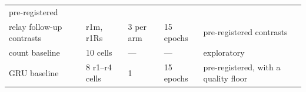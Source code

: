 \documentclass[10pt]{article}
\begin{document}
\begin{longtable}[]{@{}lllll@{}}
\begin{minipage}[t]{0.17\columnwidth}
pre-registered\strut
\end{minipage}\tabularnewline
\begin{minipage}[t]{0.17\columnwidth}\raggedright
relay follow-up contrasts\strut
\end{minipage} & \begin{minipage}[t]{0.17\columnwidth}\raggedright
r1m, r1Rs\strut
\end{minipage} & \begin{minipage}[t]{0.17\columnwidth}\raggedright
3 per arm\strut
\end{minipage} & \begin{minipage}[t]{0.17\columnwidth}\raggedright
15 epochs\strut
\end{minipage} & \begin{minipage}[t]{0.17\columnwidth}\raggedright
pre-registered contrasts\strut
\end{minipage}\tabularnewline
\begin{minipage}[t]{0.17\columnwidth}\raggedright
count baseline\strut
\end{minipage} & \begin{minipage}[t]{0.17\columnwidth}\raggedright
10 cells\strut
\end{minipage} & \begin{minipage}[t]{0.17\columnwidth}\raggedright
---\strut
\end{minipage} & \begin{minipage}[t]{0.17\columnwidth}\raggedright
---\strut
\end{minipage} & \begin{minipage}[t]{0.17\columnwidth}\raggedright
exploratory\strut
\end{minipage}\tabularnewline
\begin{minipage}[t]{0.17\columnwidth}\raggedright
GRU baseline\strut
\end{minipage} & \begin{minipage}[t]{0.17\columnwidth}\raggedright
8 r1--r4 cells\strut
\end{minipage} & \begin{minipage}[t]{0.17\columnwidth}\raggedright
1\strut
\end{minipage} & \begin{minipage}[t]{0.17\columnwidth}\raggedright
15 epochs\strut
\end{minipage} & \begin{minipage}[t]{0.17\columnwidth}\raggedright
pre-registered, with a quality floor\strut
\end{minipage}\tabularnewline

\end{longtable}
\end{document}
